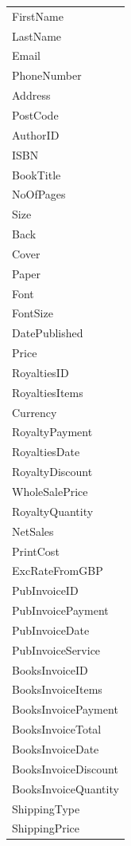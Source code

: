 \begin{tabular}{|p{3.5cm}|}
    \hline
    FirstName \\
    LastName \\
    Email \\
    PhoneNumber \\
    Address \\
    PostCode \\
    AuthorID \\
    ISBN \\
    BookTitle \\
    NoOfPages \\
    Size \\
    Back \\
    Cover \\
    Paper \\
    Font \\
    FontSize \\
    DatePublished \\
    Price \\
    RoyaltiesID \\
    RoyaltiesItems \\
    Currency \\
    RoyaltyPayment \\
    RoyaltiesDate \\
    RoyaltyDiscount \\
    WholeSalePrice \\
    RoyaltyQuantity \\
    NetSales \\
    PrintCost \\
    ExcRateFromGBP \\
    PubInvoiceID \\
    PubInvoicePayment \\
    PubInvoiceDate \\
    PubInvoiceService \\
    BooksInvoiceID \\
    BooksInvoiceItems \\
    BooksInvoicePayment \\
    BooksInvoiceTotal \\
    BooksInvoiceDate \\
    BooksInvoiceDiscount \\
    BooksInvoiceQuantity \\
    ShippingType \\
    ShippingPrice \\
    \hline
\end{tabular}

